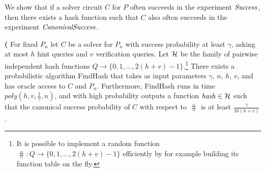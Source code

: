 We show that if a solver circuit $C$ for $P$ often succeeds in the experiment $\operatorname{\mathit{Success}}$,
then there exists a hash function such that $C$ also often succeeds in the experiment $\operatorname{\mathit{CanonicalSuccess}}$.
%
%
\begin{lemma}\textbf{(}
\label{lemma:hash_function_probability}
For fixed $P_n$ let $C$ be a solver for $P_n$ with success probability at least $\gamma$,
asking at most $h$ hint queries and $v$ verification queries.
Let $\mathcal{H}$ be the family of pairwise independent hash functions $Q \rightarrow \{0,1, \dots,2(h+v)-1\}$.\footnote{It
is possible to implement a random function $\hash: Q \rightarrow \{0,1,\dotsc, 2(h+v)-1\}$ efficiently by for example building its function table on the fly.}
There exists a probabilistic algorithm FindHash that takes as input
parameters $\gamma$, $n$, $h$, $v$, and has oracle access to $C$ and $P_n$.
Furthermore, FindHash runs in time $\mathit{poly}(h,v,\frac{1}{\gamma},n)$,
and with high probability outputs a function $\operatorname{\mathit{hash}} \in \mathcal{H}$
such that the canonical success probability of $C$ with respect to $\hash$ is at least $\frac{\gamma}{16(h+v)}$.
\end{lemma}
%
